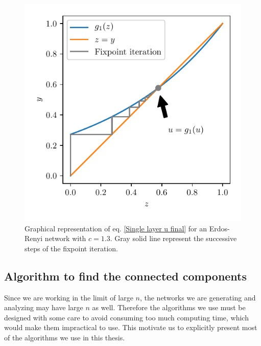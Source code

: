 \documentclass[
11pt, %
american, %
singlespacing, %
final, %
nolistspacing, %
liststotoc, %
headsepline, %
]{MastersDoctoralThesis} %
\begin{document}
\begin{figure}
	\includegraphics[scale=1]{u_solution_graphically.pdf}
	\caption{Graphical representation of eq. \eqref{Single layer u final} for an Erdos-Renyi network with $c = 1.3$. Gray solid line represent the successive steps of the fixpoint iteration.}
	\label{Figure: Solution of of u = g1(u) graphically}
\end{figure}

\subsection{Algorithm to find the connected components}
\label{Section: Algorithm to find the GCC}

Since we are working in the limit of large $n$, the networks we are generating and analyzing may have large $n$ as well. Therefore the algorithms we use must be designed with some care to avoid consuming too much computing time, which would make them impractical to use. This motivate us to explicitly present most of the algorithms we use in this thesis.
\end{document}
